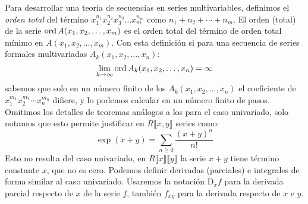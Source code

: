   Para desarrollar una teoría de secuencias en series multivariables,
  definimos el \emph{orden total}%
  del término \(x_1^{n_1} x_2^{n_2} x_3^{n_3} \dotso x_m^{n_m}\)
  como \(n_1 + n_2 + \dotsb + n_m\).
  El orden (total) de la serie \(\operatorname{ord} A(x_1, x_2, \dotsc, x_m)\)
  es el orden total del término
  de orden total mínimo en \(A(x_1, x_2, \dotsc, x_m)\).
  Con esta definición
  si para una secuencia
  de series formales multivariadas \(A_k(x_1, x_2, \dotsc, x_n)\):
  \begin{equation*}
    \lim_{k \rightarrow \infty} \operatorname{ord} A_k (x_1, x_2, \dotsc, x_n)
      = \infty
  \end{equation*}
  sabemos que solo en un número finito de los \(A_k(x_1, x_2, \dotsc, x_n)\)
  el coeficiente de \(x_1^{m_1} x_2^{m_2} \dotsm x_n^{m_n}\)
  difiere,
  y lo podemos calcular en un número finito de pasos.
  Omitimos los detalles
  de teoremas análogos a los para el caso univariado,
  solo notamos que esto permite justificar
  en \(R \llbracket x, y \rrbracket\)
  series como:
  \begin{equation*}
    \exp(x + y)
      = \sum_{n \ge 0} \frac{(x + y)^n}{n!}
  \end{equation*}
  Esto no resulta del caso univariado,
  en \(R \llbracket x \rrbracket \llbracket y \rrbracket\)
  la serie \(x + y\) tiene término constante \(x\),
  que no es cero.
  Podemos definir derivadas (parciales) e integrales
  de forma similar al caso univariado.
  Usaremos la notación \(\mathrm{D}_x f\) para la derivada parcial
  respecto de \(x\) de la serie \(f\),
  también \(f_{x y}\) para la derivada respecto de \(x\) e \(y\).

